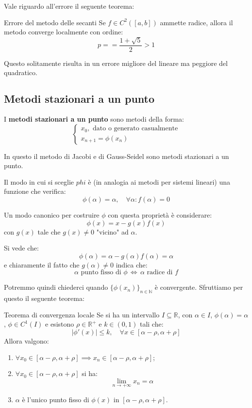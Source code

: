 \documentclass[a4paper,11pt]{article}
\begin{document}
Vale riguardo all'errore il seguente teorema:
\begin{theorem}{Errore del metodo delle secanti}
	Se $f \in C^2([a, b])$ ammette radice, allora il metodo converge  localmente con ordine:
	$$
		p = = \frac{1 + \sqrt{5}}{2} > 1
	$$
\end{theorem}

Questo solitamente risulta in un errore migliore del lineare ma peggiore del quadratico.

\subsection{Metodi stazionari a un punto}
I \textbf{metodi stazionari a un punto} sono metodi della forma:
\[
	\begin{cases}
		x_0, \text{ dato o generato casualmente} \\
		x_{n + 1} = \phi(x_n)
	\end{cases}
\]

In questo il metodo di Jacobi e di Gauss-Seidel sono metodi stazionari a un punto.

Il modo in cui si sceglie $phi$ è (in analogia ai metodi per sistemi lineari) una funzione che verifica:
$$
\phi(\alpha) = \alpha, \quad \forall \alpha : f(\alpha) = 0
$$

Un modo canonico per costruire $\phi$ con questa proprietà è considerare:
$$
\phi(x) = x - g(x) f(x)
$$
con $g(x)$ tale che $g(x) \neq 0$ "vicino" ad $\alpha$.

Si vede che:
$$
\phi(\alpha) = \alpha - g(\alpha) f(\alpha) = \alpha
$$
e chiaramente il fatto che $g(\alpha) \neq 0$ indica che:
$$
\alpha \text{ punto fisso di $\phi$} \, \Leftrightarrow \, \alpha \text{ radice di $f$}
$$

Potremmo quindi chiederci quando $\{ \phi(x_n) \}_{n \in \mathbb{N}}$ è convergente.
Sfruttiamo per questo il seguente teorema:
\begin{theorem}{Teorema di convergenza locale}
	Se si ha un intervallo $I \subseteq \mathbb{R}$, con $\alpha \in I$, $\phi(\alpha) = \alpha$, $\phi \in C^1(I)$ e esistono $\rho \in \mathbb{R}^+$ e $k \in (0, 1)$ tali che:
	$$
	|\phi'(x)| \leq k, \quad \forall x \in [\alpha - \rho, \alpha + \rho]
	$$
	Allora valgono:
	\begin{enumerate}
		\item $\forall x_0 \in [\alpha - \rho, \alpha + \rho] \implies x_n \in [\alpha - \rho, \alpha + \rho]$;
		\item $\forall x_0 \in [\alpha - \rho, \alpha + \rho]$ si ha:
			$$
				\lim_{n \rightarrow + \infty} x_n = \alpha
			$$
		\item $\alpha$ è l'unico punto fisso di $\phi(x)$ in $[\alpha - \rho, \alpha + \rho]$.
	\end{enumerate}
\end{theorem}
\end{document}
